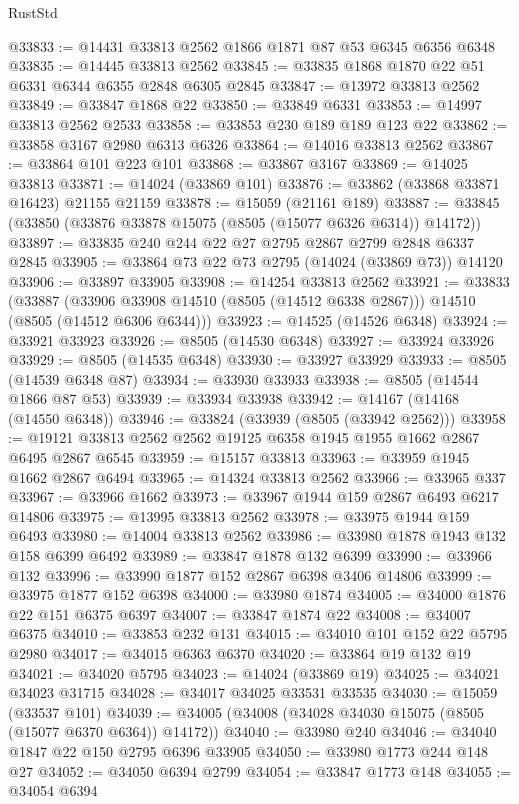 \begin{lexlean}{RustStd}
\begin{coremodule}
@33833 := @14431 @33813 @2562 @1866 @1871 @87 @53 @6345 @6356 @6348
@33835 := @14445 @33813 @2562
@33845 := @33835 @1868 @1870 @22 @51 @6331 @6344 @6355 @2848 @6305 @2845
@33847 := @13972 @33813 @2562
@33849 := @33847 @1868 @22
@33850 := @33849 @6331
@33853 := @14997 @33813 @2562 @2533
@33858 := @33853 @230 @189 @189 @123 @22
@33862 := @33858 @3167 @2980 @6313 @6326
@33864 := @14016 @33813 @2562
@33867 := @33864 @101 @223 @101
@33868 := @33867 @3167
@33869 := @14025 @33813
@33871 := @14024 (@33869 @101)
@33876 := @33862 (@33868 @33871 @16423) @21155 @21159
@33878 := @15059 (@21161 @189)
@33887 := @33845 (@33850 (@33876 @33878 @15075 (@8505 (@15077 @6326 @6314)) @14172))
@33897 := @33835 @240 @244 @22 @27 @2795 @2867 @2799 @2848 @6337 @2845
@33905 := @33864 @73 @22 @73 @2795 (@14024 (@33869 @73)) @14120
@33906 := @33897 @33905
@33908 := @14254 @33813 @2562
@33921 := @33833
    (@33887 (@33906 @33908 @14510 (@8505 (@14512 @6338 @2867))) @14510 (@8505 (@14512 @6306 @6344)))
@33923 := @14525 (@14526 @6348)
@33924 := @33921 @33923
@33926 := @8505 (@14530 @6348)
@33927 := @33924 @33926
@33929 := @8505 (@14535 @6348)
@33930 := @33927 @33929
@33933 := @8505 (@14539 @6348 @87)
@33934 := @33930 @33933
@33938 := @8505 (@14544 @1866 @87 @53)
@33939 := @33934 @33938
@33942 := @14167 (@14168 (@14550 @6348))
@33946 := @33824 (@33939 (@8505 (@33942 @2562)))
@33958 := @19121 @33813 @2562 @2562 @19125 @6358 @1945 @1955 @1662 @2867 @6495 @2867 @6545
@33959 := @15157 @33813
@33963 := @33959 @1945 @1662 @2867 @6494
@33965 := @14324 @33813 @2562
@33966 := @33965 @337
@33967 := @33966 @1662
@33973 := @33967 @1944 @159 @2867 @6493 @6217 @14806
@33975 := @13995 @33813 @2562
@33978 := @33975 @1944 @159 @6493
@33980 := @14004 @33813 @2562
@33986 := @33980 @1878 @1943 @132 @158 @6399 @6492
@33989 := @33847 @1878 @132 @6399
@33990 := @33966 @132
@33996 := @33990 @1877 @152 @2867 @6398 @3406 @14806
@33999 := @33975 @1877 @152 @6398
@34000 := @33980 @1874
@34005 := @34000 @1876 @22 @151 @6375 @6397
@34007 := @33847 @1874 @22
@34008 := @34007 @6375
@34010 := @33853 @232 @131
@34015 := @34010 @101 @152 @22 @5795 @2980
@34017 := @34015 @6363 @6370
@34020 := @33864 @19 @132 @19
@34021 := @34020 @5795
@34023 := @14024 (@33869 @19)
@34025 := @34021 @34023 @31715
@34028 := @34017 @34025 @33531 @33535
@34030 := @15059 (@33537 @101)
@34039 := @34005 (@34008 (@34028 @34030 @15075 (@8505 (@15077 @6370 @6364)) @14172))
@34040 := @33980 @240
@34046 := @34040 @1847 @22 @150 @2795 @6396 @33905
@34050 := @33980 @1773 @244 @148 @27
@34052 := @34050 @6394 @2799
@34054 := @33847 @1773 @148
@34055 := @34054 @6394

\end{coremodule}
\end{lexlean}
